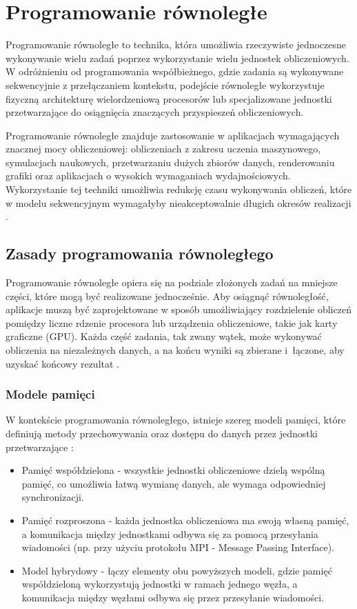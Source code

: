 \section{Programowanie równoległe}

Programowanie równoległe to technika, która umożliwia rzeczywiste jednoczesne wykonywanie wielu zadań poprzez wykorzystanie wielu jednostek obliczeniowych. W odróżnieniu od programowania współbieżnego, gdzie zadania są wykonywane sekwencyjnie z przełączaniem kontekstu, podejście równoległe wykorzystuje fizyczną architekturę wielordzeniową procesorów lub specjalizowane jednostki przetwarzające do osiągnięcia znaczących przyspieszeń obliczeniowych.

Programowanie równoległe znajduje zastosowanie w aplikacjach wymagających znacznej mocy obliczeniowej: obliczeniach z zakresu uczenia maszynowego, symulacjach naukowych, przetwarzaniu dużych zbiorów danych, renderowaniu grafiki oraz aplikacjach o wysokich wymaganiach wydajnościowych. Wykorzystanie tej techniki umożliwia redukcję czasu wykonywania obliczeń, które w modelu sekwencyjnym wymagałyby nieakceptowalnie długich okresów realizacji \cite{MasteringConcurrencyAndParallelProgramming,CUDA}.

\subsection{Zasady programowania równoległego}
Programowanie równoległe opiera się na podziale złożonych zadań na mniejsze części, które mogą być realizowane jednocześnie. Aby osiągnąć równoległość, aplikacje muszą być zaprojektowane w sposób umożliwiający rozdzielenie obliczeń pomiędzy liczne rdzenie procesora lub urządzenia obliczeniowe, takie jak karty graficzne (GPU). Każda część zadania, tak zwany wątek, może wykonywać obliczenia na niezależnych danych, a na końcu wyniki są zbierane i~łączone, aby uzyskać końcowy rezultat \cite{CUDA}.

\subsubsection{Modele pamięci}
W kontekście programowania równoległego, istnieje szereg modeli pamięci, które definiują metody przechowywania oraz dostępu do danych przez jednostki przetwarzające \cite{CUDA}:
\begin{itemize}
    \item Pamięć współdzielona  - wszystkie jednostki obliczeniowe dzielą wspólną pamięć, co umożliwia łatwą wymianę danych, ale wymaga odpowiedniej synchronizacji.
    \item Pamięć rozproszona  - każda jednostka obliczeniowa ma swoją własną pamięć, a komunikacja między jednostkami odbywa się za pomocą przesyłania wiadomości (np. przy użyciu protokołu MPI - Message Passing Interface).
    \item Model hybrydowy - łączy elementy obu powyższych modeli, gdzie pamięć współdzieloną wykorzystują jednostki w ramach jednego węzła, a komunikacja między węzłami odbywa się przez przesyłanie wiadomości.
\end{itemize}
